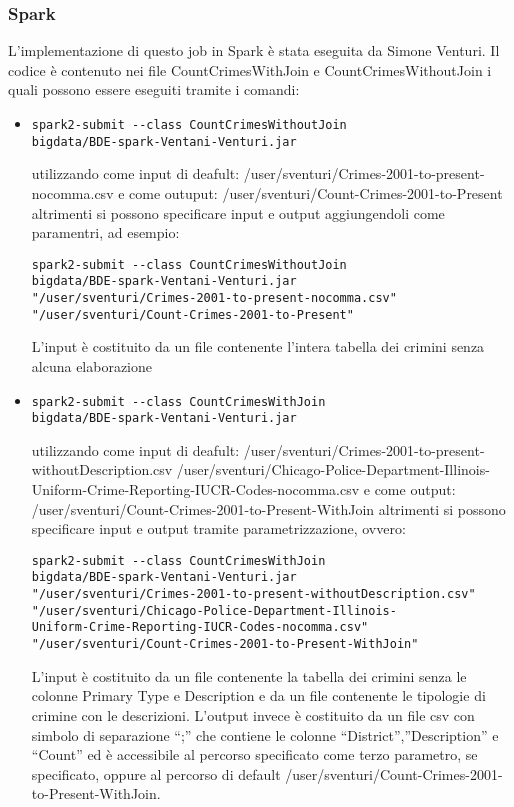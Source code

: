 \documentclass[10pt]{article}
\begin{document}
\subsubsection{Spark}
L’implementazione di questo job in Spark è stata eseguita da Simone Venturi. Il codice è contenuto nei file CountCrimesWithJoin e CountCrimesWithoutJoin i quali possono essere eseguiti tramite i comandi:
\begin{itemize}
\item
\begin{lstlisting}
spark2-submit --class CountCrimesWithoutJoin
bigdata/BDE-spark-Ventani-Venturi.jar
\end{lstlisting}
utilizzando come input di deafult: /user/sventuri/Crimes-2001-to-present-nocomma.csv
e come outuput: /user/sventuri/Count-Crimes-2001-to-Present
altrimenti si possono specificare input e output aggiungendoli come paramentri, ad esempio: 
\begin{lstlisting}
spark2-submit --class CountCrimesWithoutJoin 
bigdata/BDE-spark-Ventani-Venturi.jar
"/user/sventuri/Crimes-2001-to-present-nocomma.csv" 
"/user/sventuri/Count-Crimes-2001-to-Present"	
\end{lstlisting}
L’input è costituito da un file contenente l’intera tabella dei crimini senza alcuna elaborazione
\item
\begin{lstlisting}
spark2-submit --class CountCrimesWithJoin 
bigdata/BDE-spark-Ventani-Venturi.jar
\end{lstlisting}
utilizzando come input di deafult: 
/user/sventuri/Crimes-2001-to-present-withoutDescription.csv 
/user/sventuri/Chicago-Police-Department-Illinois-Uniform-Crime-Reporting-IUCR-Codes-nocomma.csv
e come output: /user/sventuri/Count-Crimes-2001-to-Present-WithJoin
altrimenti si possono specificare input e output tramite parametrizzazione, ovvero:
\begin{lstlisting}
spark2-submit --class CountCrimesWithJoin 
bigdata/BDE-spark-Ventani-Venturi.jar 
"/user/sventuri/Crimes-2001-to-present-withoutDescription.csv" 
"/user/sventuri/Chicago-Police-Department-Illinois-
Uniform-Crime-Reporting-IUCR-Codes-nocomma.csv" 
"/user/sventuri/Count-Crimes-2001-to-Present-WithJoin"
\end{lstlisting}
L’input è costituito da un file contenente la tabella dei crimini senza le colonne Primary Type e Description e da un file contenente le tipologie di crimine con le descrizioni.
L’output invece è costituito da un file csv con simbolo di separazione “;” che contiene le colonne “District”,”Description” e “Count” ed è accessibile al percorso specificato come terzo parametro, se specificato, oppure al percorso di default /user/sventuri/Count-Crimes-2001-to-Present-WithJoin.
\end{itemize}
\end{document}
